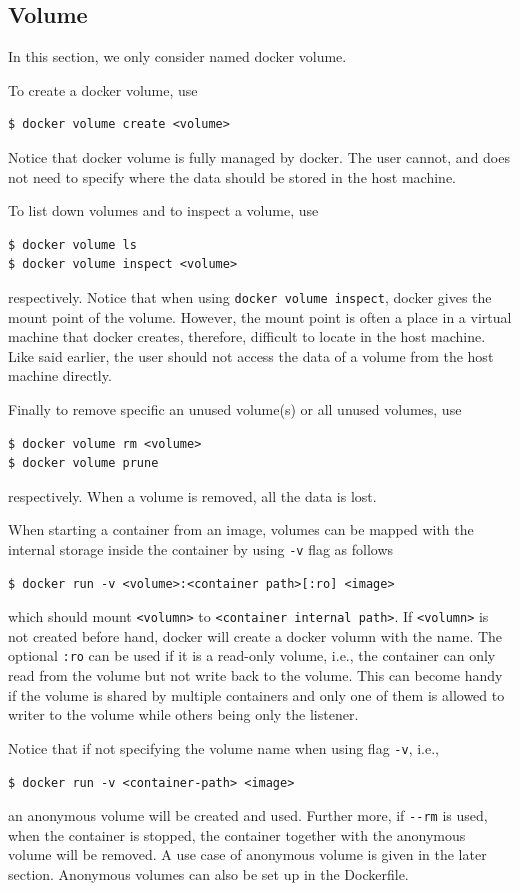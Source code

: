 \subsection{Volume}

In this section, we only consider named docker volume.

To create a docker volume, use
\begin{lstlisting}
$ docker volume create <volume>
\end{lstlisting}
Notice that docker volume is fully managed by docker. The user cannot, and does not need to specify where the data should be stored in the host machine.

To list down volumes and to inspect a volume, use
\begin{lstlisting}
$ docker volume ls
$ docker volume inspect <volume>
\end{lstlisting}
respectively. Notice that when using \verb|docker volume inspect|, docker gives the mount point of the volume. However, the mount point is often a place in a virtual machine that docker creates, therefore, difficult to locate in the host machine. Like said earlier, the user should not access the data of a volume from the host machine directly.

Finally to remove specific an unused volume(s) or all unused volumes, use
\begin{lstlisting}
$ docker volume rm <volume>
$ docker volume prune
\end{lstlisting}
respectively. When a volume is removed, all the data is lost.

When starting a container from an image, volumes can be mapped with the internal storage inside the container by using \verb|-v| flag as follows
\begin{lstlisting}
$ docker run -v <volume>:<container path>[:ro] <image>
\end{lstlisting}
which should mount \verb|<volumn>| to \verb|<container internal path>|. If \verb|<volumn>| is not created before hand, docker will create a docker volumn with the name. The optional \verb|:ro| can be used if it is a read-only volume, i.e., the container can only read from the volume but not write back to the volume. This can become handy if the volume is shared by multiple containers and only one of them is allowed to writer to the volume while others being only the listener.

Notice that if not specifying the volume name when using flag \verb|-v|, i.e.,
\begin{lstlisting}
$ docker run -v <container-path> <image>
\end{lstlisting}
an anonymous volume will be created and used. Further more, if \verb|--rm| is used, when the container is stopped, the container together with the anonymous volume will be removed. A use case of anonymous volume is given in the later section.
 Anonymous volumes can also be set up in the Dockerfile.

